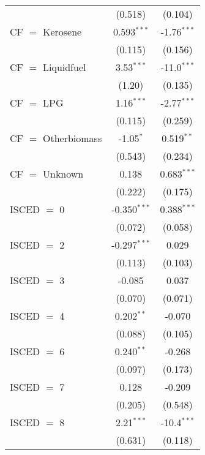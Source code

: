 \begin{table}[htbp!]
\begin{adjustbox}{width = 1\textwidth, max height = 0.95\textheight, center}
\begin{threeparttable}[b]
\begin{tabular}{lcc}
                                 & (0.518)        & (0.104)\\   
            CF $=$ Kerosene      & 0.593$^{***}$  & -1.76$^{***}$\\   
                                 & (0.115)        & (0.156)\\   
            CF $=$ Liquidfuel    & 3.53$^{***}$   & -11.0$^{***}$\\   
                                 & (1.20)         & (0.135)\\   
            CF $=$ LPG           & 1.16$^{***}$   & -2.77$^{***}$\\   
                                 & (0.115)        & (0.259)\\   
            CF $=$ Otherbiomass  & -1.05$^{*}$    & 0.519$^{**}$\\   
                                 & (0.543)        & (0.234)\\   
            CF $=$ Unknown       & 0.138          & 0.683$^{***}$\\   
                                 & (0.222)        & (0.175)\\   
            ISCED $=$ 0          & -0.350$^{***}$ & 0.388$^{***}$\\   
                                 & (0.072)        & (0.058)\\   
            ISCED $=$ 2          & -0.297$^{***}$ & 0.029\\   
                                 & (0.113)        & (0.103)\\   
            ISCED $=$ 3          & -0.085         & 0.037\\   
                                 & (0.070)        & (0.071)\\   
            ISCED $=$ 4          & 0.202$^{**}$   & -0.070\\   
                                 & (0.088)        & (0.105)\\   
            ISCED $=$ 6          & 0.240$^{**}$   & -0.268\\   
                                 & (0.097)        & (0.173)\\   
            ISCED $=$ 7          & 0.128          & -0.209\\   
                                 & (0.205)        & (0.548)\\   
            ISCED $=$ 8          & 2.21$^{***}$   & -10.4$^{***}$\\   
                                 & (0.631)        & (0.118)\\   

\end{tabular}
\end{threeparttable}
\end{adjustbox}
\end{table}
